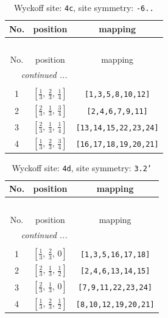 \documentclass[fleqn,8pt]{jsarticle}
\begin{document}
\renewcommand{\arraystretch}{1.2}
\begin{longtable}{ccc}
\caption{Wyckoff site: {\tt 4c}, site symmetry: {\tt -6..}}
 \\
 \hline \hline
No. & position & mapping \\ \hline \endfirsthead

\multicolumn{2}{l}{\tablename\ \thetable{}} \\
 \hline \hline
No. & position & mapping \\ \hline \endhead

 \hline \hline
\multicolumn{2}{r}{\footnotesize\it continued ...} \\ \endfoot

 \hline \hline
\multicolumn{2}{r}{} \\ \endlastfoot

1 & $\left[ \frac{1}{3},\, \frac{2}{3},\, \frac{1}{4} \right]$ & {\tt [1,3,5,8,10,12]} \\ \hline
2 & $\left[ \frac{2}{3},\, \frac{1}{3},\, \frac{3}{4} \right]$ & {\tt [2,4,6,7,9,11]} \\ \hline
3 & $\left[ \frac{2}{3},\, \frac{1}{3},\, \frac{1}{4} \right]$ & {\tt [13,14,15,22,23,24]} \\ \hline
4 & $\left[ \frac{1}{3},\, \frac{2}{3},\, \frac{3}{4} \right]$ & {\tt [16,17,18,19,20,21]} \\
\end{longtable}
\renewcommand{\arraystretch}{1.2}
\begin{longtable}{ccc}
\caption{Wyckoff site: {\tt 4d}, site symmetry: {\tt 3.2'}}
 \\
 \hline \hline
No. & position & mapping \\ \hline \endfirsthead

\multicolumn{2}{l}{\tablename\ \thetable{}} \\
 \hline \hline
No. & position & mapping \\ \hline \endhead

 \hline \hline
\multicolumn{2}{r}{\footnotesize\it continued ...} \\ \endfoot

 \hline \hline
\multicolumn{2}{r}{} \\ \endlastfoot

1 & $\left[ \frac{1}{3},\, \frac{2}{3},\, 0 \right]$ & {\tt [1,3,5,16,17,18]} \\ \hline
2 & $\left[ \frac{2}{3},\, \frac{1}{3},\, \frac{1}{2} \right]$ & {\tt [2,4,6,13,14,15]} \\ \hline
3 & $\left[ \frac{2}{3},\, \frac{1}{3},\, 0 \right]$ & {\tt [7,9,11,22,23,24]} \\ \hline
4 & $\left[ \frac{1}{3},\, \frac{2}{3},\, \frac{1}{2} \right]$ & {\tt [8,10,12,19,20,21]} \\
\end{longtable}
\end{document}
